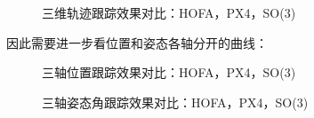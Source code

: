   
  \begin{figure}[h]
      \centering
      \begin{minipage}[t]{0.33\textwidth}
        \centering
      \end{minipage}\hfill
      \begin{minipage}[t]{0.33\textwidth}
        \centering
      \end{minipage}\hfill
      \begin{minipage}[t]{0.33\textwidth}
        \centering
      \end{minipage}
      \caption{三维轨迹跟踪效果对比：HOFA，PX4，SO(3)}
      \label{matlab_3d}
  \end{figure}
 
  因此需要进一步看位置和姿态各轴分开的曲线：

  \begin{figure}[h]
    \centering
    \begin{minipage}[t]{0.33\textwidth}
      \centering
    \end{minipage}\hfill
    \begin{minipage}[t]{0.33\textwidth}
      \centering
    \end{minipage}\hfill
    \begin{minipage}[t]{0.33\textwidth}
      \centering
    \end{minipage}
    \caption{三轴位置跟踪效果对比：HOFA，PX4，SO(3)}
    \label{matlab_x}
\end{figure}

\begin{figure}[h]
  \centering
  \begin{minipage}[t]{0.33\textwidth}
    \centering
  \end{minipage}\hfill
  \begin{minipage}[t]{0.33\textwidth}
    \centering
  \end{minipage}\hfill
  \begin{minipage}[t]{0.33\textwidth}
    \centering
  \end{minipage}
  \caption{三轴姿态角跟踪效果对比：HOFA，PX4，SO(3)}
  \label{matlab_angle}
\end{figure}

